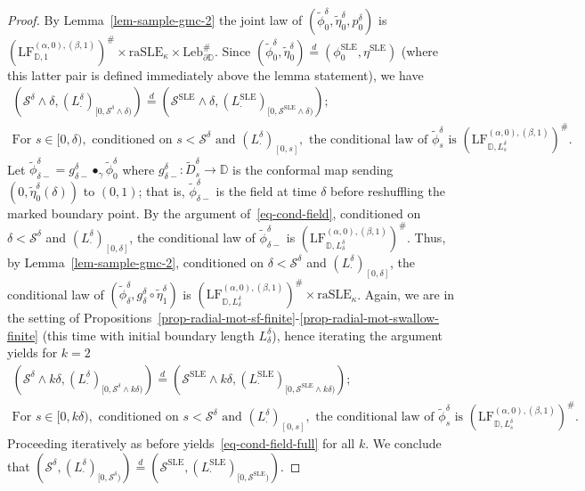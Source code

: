 \documentclass[a4paper]{article}
\numberwithin{equation}{section}
\newcommand{\eqb}{\begin{equation}}
\newcommand{\eqe}{\end{equation}}
\newcommand{\D}{\mathbb{D}}
\newcommand{\qduration}{\mathcal{S}}
\newcommand{\LF}{\mathrm{LF}}
\newcommand{\SLE}{\mathrm{SLE}}
\theoremstyle{remark}
\numberwithin{equation}{section}
\begin{document}
\begin{proof}
    
    By Lemma~\ref{lem-sample-gmc-2} the joint law of $(\tilde\phi^\delta_0, \tilde \eta^\delta_0, p^\delta_0)$ is $(\LF_{\D, 1}^{(\alpha, 0), (\beta, 1)})^\#\times \mathrm{raSLE}_\kappa \times \mathrm{Leb}_{\partial \D}^\#$. 
    Since $(\tilde \phi^\delta_0, \tilde \eta^\delta_0) \stackrel d= (\phi^\SLE_0, \eta^\SLE)$ (where this latter pair is defined immediately above the lemma statement), we have 
    \eqb\label{eq-cond-field}
    \begin{gathered}
    (\qduration^\delta \wedge \delta, (L_\cdot^\delta)_{[0, \qduration^\delta \wedge \delta)}) \stackrel d= (\qduration^\SLE \wedge \delta,(L_\cdot^\SLE)_{[0,\qduration^\SLE \wedge \delta)});
        \\
        \text{For }s \in [0,\delta), \text{ conditioned on } s< \qduration^\delta \text{ and } (L_\cdot^\delta)_{[0, s]}, \text{ the conditional law of }\tilde \phi^\delta_s \text{ is } (\LF_{\D, L_s^\delta}^{(\alpha,0), (\beta, 1)})^\#.
    \end{gathered}
    \eqe
    Let $\tilde \phi^\delta_{\delta-} = g^\delta_{\delta-} \bullet_\gamma \tilde \phi^\delta_0$ where $g^\delta_{\delta-}: \tilde D^\delta_s \to \D$ is the conformal map sending $(0, \tilde \eta^\delta_0(\delta))$ to $(0,1)$; that is, $\tilde \phi^\delta_{\delta-}$ is the field at time $\delta$ before reshuffling the marked boundary point. By the argument of~\eqref{eq-cond-field}, conditioned on $\delta < \qduration^\delta$ and $(L_\cdot^\delta)_{[0, \delta]}$, the conditional law of $\tilde \phi^\delta_{\delta-}$ is $(\LF_{\D, L_\delta^\delta}^{(\alpha,0), (\beta, 1)})^\#$. Thus, by Lemma~\ref{lem-sample-gmc-2}, conditioned on $\delta < \qduration^\delta$ and $(L_\cdot^\delta)_{[0,\delta]}$, the conditional law of $(\tilde \phi^\delta_\delta, g^\delta_\delta \circ \tilde \eta^\delta_1)$ is $(\LF_{\D, L^\delta_\delta}^{(\alpha,0), (\beta, 1)})^\# \times \mathrm{raSLE}_\kappa$. Again, we are in the setting of Propositions~\ref{prop-radial-mot-sf-finite}-\ref{prop-radial-mot-swallow-finite} (this time with initial boundary length $L_\delta^\delta$), hence iterating the argument yields for $k=2$ 
    \eqb\label{eq-cond-field-full}
       \begin{gathered}
            (\qduration^\delta \wedge k\delta,(L_\cdot^\delta)_{[0, \qduration^\delta \wedge k\delta)}) \stackrel d= (\qduration^\SLE \wedge k\delta,(L_\cdot^\SLE)_{[0,\qduration^\SLE \wedge k\delta)});\\
           \text{For }s \in [0,k\delta), \text{ conditioned on } s< \qduration^\delta \text{ and } (L_\cdot^\delta)_{[0, s]}, \text{ the conditional law of }\tilde \phi^\delta_s \text{ is } (\LF_{\D, L_s^\delta}^{(\alpha,0), (\beta, 1)})^\#.
       \end{gathered}
    \eqe
    Proceeding iteratively as before yields~\eqref{eq-cond-field-full} for all $k$. We conclude that $(\qduration^\delta,(L^\delta_\cdot)_{[0,\qduration^\delta)}) \stackrel d= (\qduration^\SLE,(L_\cdot^\SLE)_{[0,\qduration^\SLE)})$. 
    

\end{proof}
\end{document}
